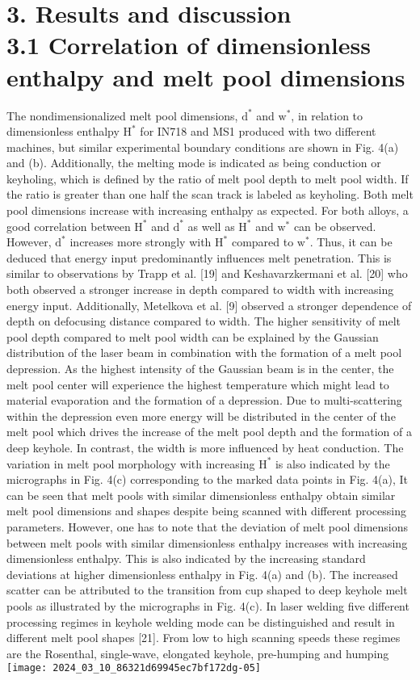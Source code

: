 \documentclass[10pt]{article}
\begin{document}
\section*{3. Results and discussion \\
 3.1 Correlation of dimensionless enthalpy and melt pool dimensions}
The nondimensionalized melt pool dimensions, $\mathrm{d}^{*}$ and $\mathrm{w}^{*}$, in relation to dimensionless enthalpy $\mathrm{H}^{*}$ for IN718 and MS1 produced with two different machines, but similar experimental boundary conditions are shown in Fig. 4(a) and (b). Additionally, the melting mode is indicated as being conduction or keyholing, which is defined by the ratio of melt pool depth to melt pool width. If the ratio is greater than one half the scan track is labeled as keyholing. Both melt pool dimensions increase with increasing enthalpy as expected. For both alloys, a good correlation between $\mathrm{H}^{*}$ and $\mathrm{d}^{*}$ as well as $\mathrm{H}^{*}$ and $\mathrm{w}^{*}$ can be observed. However, $\mathrm{d}^{*}$ increases more strongly with $\mathrm{H}^{*}$ compared to $\mathrm{w}^{*}$. Thus, it can be deduced that energy input predominantly influences melt penetration. This is similar to observations by Trapp et al. [19] and Keshavarzkermani et al. [20] who both observed a stronger increase in depth compared to width with increasing energy input. Additionally, Metelkova et al. [9] observed a stronger dependence of depth on defocusing distance compared to width. The higher sensitivity of melt pool depth compared to melt pool width can be explained by the Gaussian distribution of the laser beam in combination with the formation of a melt pool depression. As the highest intensity of the Gaussian beam is in the center, the melt pool center will experience the highest temperature which might lead to material evaporation and the formation of a depression. Due to multi-scattering within the depression even more energy will be distributed in the center of the melt pool which drives the increase of the melt pool depth and the formation of a deep keyhole. In contrast, the width is more influenced by heat conduction. The variation in melt pool morphology with increasing $\mathrm{H}^{*}$ is also indicated by the micrographs in Fig. 4(c) corresponding to the marked data points in Fig. 4(a), It can be seen that melt pools with similar dimensionless enthalpy obtain similar melt pool dimensions and shapes despite being scanned with different processing parameters. However, one has to note that the deviation of melt pool dimensions between melt pools with similar dimensionless enthalpy increases with increasing dimensionless enthalpy. This is also indicated by the increasing standard deviations at higher dimensionless enthalpy in Fig. 4(a) and (b). The increased scatter can be attributed to the transition from cup shaped to deep keyhole melt pools as illustrated by the micrographs in Fig. 4(c). In laser welding five different processing regimes in keyhole welding mode can be distinguished and result in different melt pool shapes [21]. From low to high scanning speeds these regimes are the Rosenthal, single-wave, elongated keyhole, pre-humping and humping\\
\texttt{[image: 2024\_03\_10\_86321d69945ec7bf172dg-05]}
\end{document}
